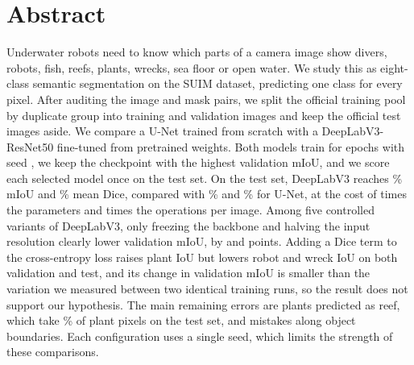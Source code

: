 \section*{Abstract}
Underwater robots need to know which parts of a camera image show divers,
robots, fish, reefs, plants, wrecks, sea floor or open water. We study this as
eight-class semantic segmentation on the SUIM dataset, predicting one class for
every pixel. After auditing the image and mask pairs, we split the official
training pool by duplicate group into \suimTrainImages{} training and
\suimValImages{} validation images and keep the \testImages{} official test
images aside. We compare a U-Net trained from scratch with a DeepLabV3-ResNet50
fine-tuned from pretrained weights. Both models train for \unetEpochs{} epochs
with seed \unetSeed{}, we keep the checkpoint with the highest validation mIoU,
and we score each selected model once on the test set. On the test set,
DeepLabV3 reaches \deeplabCeTestMiou\% mIoU and \deeplabCeTestDice\% mean Dice,
compared with \unetTestMiou\% and \unetTestDice\% for U-Net, at the cost of
\parameterRatio{} times the parameters and \flopRatio{} times the operations
per image. Among five controlled variants of DeepLabV3, only freezing the
backbone and halving the input resolution clearly lower validation mIoU, by
\ablationFrozenDelta{} and \ablationLowResDelta{} points. Adding a Dice term to
the cross-entropy loss raises plant IoU but lowers robot and wreck IoU on both
validation and test, and its change in validation mIoU is smaller than the
variation we measured between two identical training runs, so the result does
not support our hypothesis. The main remaining errors are plants predicted as
reef, which take \testPlantsAsReef\% of plant pixels on the test set, and
mistakes along object boundaries. Each configuration uses a single seed, which
limits the strength of these comparisons.
